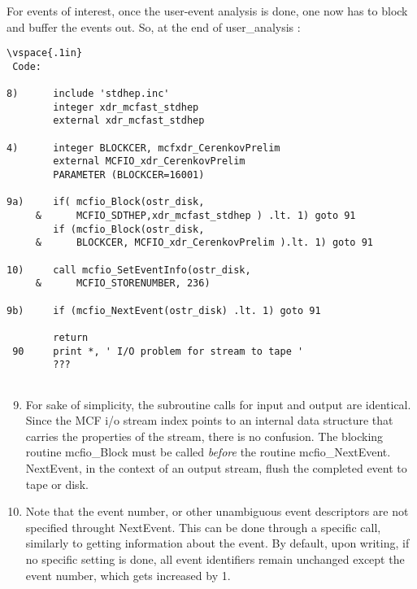 For events of interest, once the user-event analysis is done, one now has to
block and buffer the events out. So, at the end  of user\_analysis :

\begin{verbatim}
\vspace{.1in} 
 Code:
 
8)      include 'stdhep.inc'
        integer xdr_mcfast_stdhep
        external xdr_mcfast_stdhep
        
4)      integer BLOCKCER, mcfxdr_CerenkovPrelim
        external MCFIO_xdr_CerenkovPrelim
        PARAMETER (BLOCKCER=16001) 	

9a)     if( mcfio_Block(ostr_disk,
     &      MCFIO_SDTHEP,xdr_mcfast_stdhep ) .lt. 1) goto 91	
        if (mcfio_Block(ostr_disk,
     &      BLOCKCER, MCFIO_xdr_CerenkovPrelim ).lt. 1) goto 91

10)     call mcfio_SetEventInfo(ostr_disk,
     &      MCFIO_STORENUMBER, 236)
     
9b)     if (mcfio_NextEvent(ostr_disk) .lt. 1) goto 91

        return
 90     print *, ' I/O problem for stream to tape '
        ???
        
\end{verbatim}
\vspace{.1in}
\begin{enumerate}
\setcounter{enumi}{8}
\item For sake of simplicity, the subroutine calls for input and output are
identical. Since the MCF i/o stream index points to  an internal data structure
that carries the properties of the  stream,  there is no confusion. The
blocking routine mcfio\_Block must be called {\em before}  the  routine
mcfio\_NextEvent.  NextEvent, in the context of an  output stream, flush the
completed event to tape or disk.

\item Note that the event number, or other unambiguous event descriptors are
not specified throught NextEvent.  This can be done through a specific call,
similarly  to getting information about the event. By default, upon writing, if
no specific setting is done, all event identifiers remain unchanged except 
the event number, which gets increased by 1. 

\end{enumerate}

